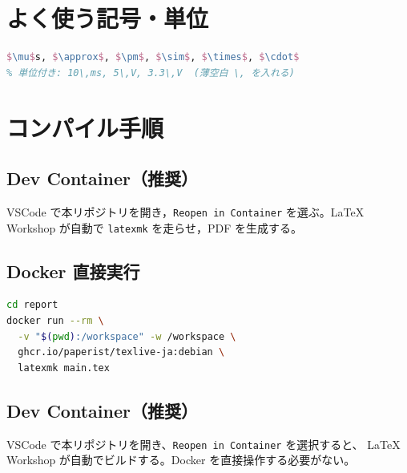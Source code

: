 \section{よく使う記号・単位}

\begin{lstlisting}[language=TeX]
$\mu$s, $\approx$, $\pm$, $\sim$, $\times$, $\cdot$
% 単位付き: 10\,ms, 5\,V, 3.3\,V  (薄空白 \, を入れる)
\end{lstlisting}

\section{コンパイル手順}

\subsection{Dev Container（推奨）}
VSCode で本リポジトリを開き，\verb|Reopen in Container| を選ぶ。LaTeX Workshop が自動で \verb|latexmk| を走らせ，PDF を生成する。

\subsection{Docker 直接実行}
\begin{lstlisting}[language=bash]
cd report
docker run --rm \
  -v "$(pwd):/workspace" -w /workspace \
  ghcr.io/paperist/texlive-ja:debian \
  latexmk main.tex
\end{lstlisting}

\subsection{Dev Container（推奨）}
VSCode で本リポジトリを開き、\texttt{Reopen in Container} を選択すると、
LaTeX Workshop が自動でビルドする。Docker を直接操作する必要がない。
